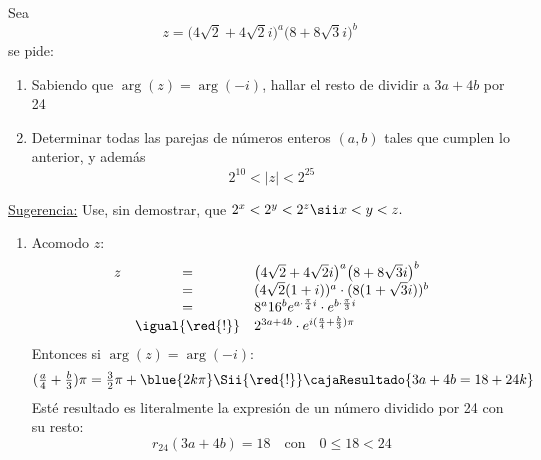 \begin{enunciado}{\ejExtra}
  Sea
  $$
    z = \big(4\sqrt{2} + 4\sqrt{2}i\big)^a \big(8+8\sqrt{3}i\big)^b
  $$
  se pide:
  \begin{enumerate}[label=\alph*)]
    \item Sabiendo que $\arg(z) = \arg(-i)$, hallar el resto de dividir a $3a + 4b$ por 24
    \item Determinar todas las parejas de números enteros $(a,b)$ tales que cumplen lo anterior, y además
          $$
            2^{10} < |z| < 2 ^{25}
          $$
  \end{enumerate}
  \underline{Sugerencia:} Use, sin demostrar, que $2^x < 2^y < 2^z \sii x < y < z.$
\end{enunciado}

\begin{enumerate}[label=\alph*)]
  \item
        Acomodo $z$:
        $$
          \begin{array}{rcl}
            z & =               & \big(4\sqrt{2} + 4\sqrt{2}i\big)^a \big(8+8\sqrt{3}i\big)^b             \\
              & =               & (4\sqrt{2} ( 1 + i ))^a \cdot (8(1 + \sqrt{3}i))^b                       \\
              & =               & 8^a 16^b  e^{a \cdot \frac{\pi}{4} i} \cdot e^{b \cdot \frac{\pi}{3} i} \\
              & \igual{\red{!}} & 2^{3a + 4b} \cdot e^{i (\frac{a}{4}  +  \frac{b}{3} ) \pi}
          \end{array}
        $$
        Entonces si $\arg(z) = \arg(-i)$:
        $$
          \textstyle
          (\frac{a}{4}  +  \frac{b}{3} ) \pi = \frac{3}{2} \pi + \blue{2k\pi}
          \Sii{\red{!}}
          \cajaResultado{3a  +  4b = 18 + 24k}
        $$
        Esté resultado es literalmente la expresión de un número dividido por 24 con su resto:
        $$
          r_{24}(3a+4b) = 18 \quad \text{con} \quad 0\leq 18 < 24
        $$


\end{enumerate}

